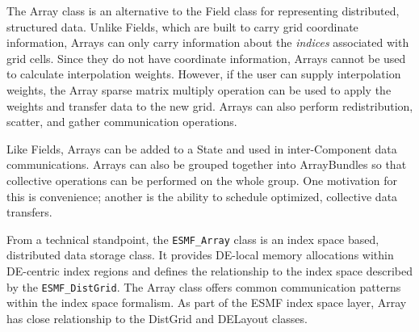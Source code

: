 
The Array class is an alternative to the Field class for representing 
distributed, structured data.  Unlike Fields, which are built to carry 
grid coordinate information, Arrays can only carry information about the 
{\it indices} associated with grid cells.  Since they do not have coordinate 
information, Arrays cannot be used to calculate interpolation weights.  
However, if the user can supply interpolation weights, the Array sparse 
matrix multiply operation can be used to apply the weights and transfer 
data to the new grid.  Arrays can also perform redistribution, scatter, 
and gather communication operations.

Like Fields, Arrays can be added to a State and used in inter-Component 
data communications.  Arrays can also be grouped together into ArrayBundles 
so that collective operations can be performed on the whole group.  One 
motivation for this is convenience; another is the ability to schedule 
optimized, collective data transfers.   

From a technical standpoint, the {\tt ESMF\_Array} class is an index space 
based, distributed data storage class. It provides DE-local memory allocations 
within DE-centric index regions and defines the relationship to the index 
space described by the {\tt ESMF\_DistGrid}. The Array class offers common 
communication patterns within the index space formalism. As part of the ESMF 
index space layer, Array has close relationship to the DistGrid and DELayout 
classes.
